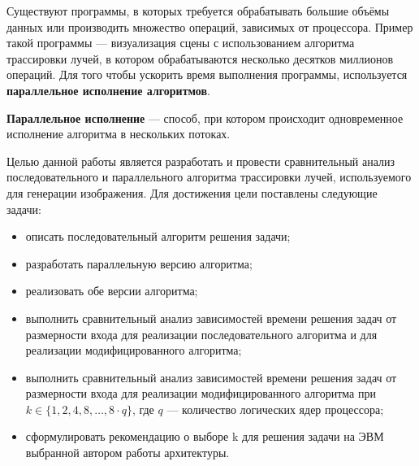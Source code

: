 
Существуют программы, в которых требуется обрабатывать большие объёмы данных или производить множество операций, зависимых от процессора. Пример такой программы --- визуализация сцены с использованием алгоритма трассировки лучей, в котором обрабатываются несколько десятков миллионов операций. Для того чтобы ускорить время выполнения программы, используется \textbf{параллельное исполнение алгоритмов}.

\textbf{Параллельное исполнение} --- способ, при котором происходит одновременное исполнение алгоритма в нескольких потоках.

Целью данной работы является разработать и провести сравнительный анализ последовательного и параллельного алгоритма трассировки лучей, используемого для генерации изображения. Для достижения цели поставлены следующие задачи:
\begin{itemize}
	\item описать последовательный алгоритм решения задачи;
	\item разработать параллельную версию алгоритма;
	\item реализовать обе версии алгоритма;
	\item выполнить сравнительный анализ зависимостей времени решения задач от размерности входа для реализации последовательного алгоритма и для реализации модифицированного алгоритма;
	\item выполнить сравнительный анализ зависимостей времени решения задач от размерности входа для реализации модифицированного алгоритма при $k \in \{1, 2, 4, 8, \dots, 8 \cdot q\}$, где $q$ --- количество логических ядер процессора;
	\item сформулировать рекомендацию о выборе k для решения задачи на ЭВМ выбранной автором работы архитектуры.
\end{itemize}
\clearpage
